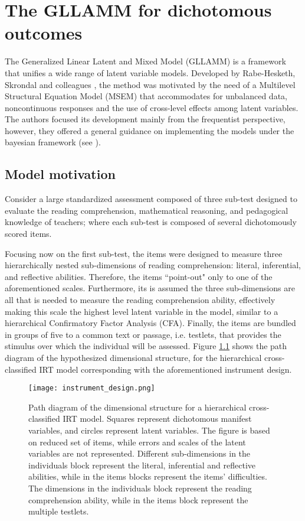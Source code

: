 \chapter{The GLLAMM for dichotomous outcomes} \label{chap:framework}

The Generalized Linear Latent and Mixed Model (GLLAMM) is a framework that unifies a wide range of latent variable models. Developed by Rabe-Hesketh, Skrondal and colleagues \cite{Rabe_et_al_2004a, Rabe_et_al_2004b, Rabe_et_al_2004c, Skrondal_et_al_2004a, Rabe_et_al_2012}, the method was motivated by the need of a Multilevel Structural Equation Model (MSEM) that accommodates for unbalanced data, noncontinuous responses and the use of cross-level effects among latent variables. The authors focused its development mainly from the frequentist perspective, however, they offered a general guidance on implementing the models under the bayesian framework (see \citet{Skrondal_et_al_2004a}).


\section{Model motivation} \label{sect:motivation}

Consider a large standardized assessment composed of three sub-test designed to evaluate the reading comprehension, mathematical reasoning, and pedagogical knowledge of teachers; where each sub-test is composed of several dichotomously scored items. 

Focusing now on the first sub-test, the items were designed to measure three hierarchically nested sub-dimensions of reading comprehension: literal, inferential, and reflective abilities. Therefore, the items ``point-out" only to one of the aforementioned scales. Furthermore, its is assumed the three sub-dimensions are all that is needed to measure the reading comprehension ability, effectively making this scale the highest level latent variable in the model, similar to a hierarchical Confirmatory Factor Analysis (CFA). Finally, the items are bundled in groups of five to a common text or passage, i.e. testlets, that provides the stimulus over which the individual will be assessed. Figure \ref{fig:design} shows the path diagram of the hypothesized dimensional structure, for the hierarchical cross-classified IRT model corresponding with the aforementioned instrument design.

\begin{figure}[h] \label{fig:design}
	\centering
	\texttt{[image: instrument\_design.png]}
	\caption{Path diagram of the dimensional structure for a hierarchical cross-classified IRT model. Squares represent dichotomous manifest variables, and circles represent latent variables. The figure is based on reduced set of items, while errors and scales of the latent variables are not represented. Different sub-dimensions in the individuals block represent the literal, inferential and reflective abilities, while in the items blocks represent the items' difficulties. The dimensions in the individuals block represent the reading comprehension ability, while in the items block represent the multiple testlets.}
\end{figure}

